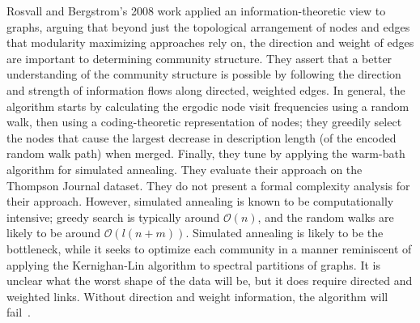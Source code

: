  \par{Rosvall and Bergstrom's 2008 work applied an information-theoretic view to graphs, arguing that beyond just the topological arrangement of nodes and edges that modularity maximizing approaches rely on, the direction and weight of edges are important to determining community structure. 
 They assert that a better understanding of the community structure is possible by following the direction and strength of information flows along directed, weighted edges. 
 In general, the algorithm starts by calculating the ergodic node visit frequencies using a random walk, then using a coding-theoretic representation of nodes; they greedily select the nodes that cause the largest decrease in description length (of the encoded random walk path) when merged. 
 Finally, they tune by applying the warm-bath algorithm for simulated annealing. 
 They evaluate their approach on the Thompson Journal dataset. 
 They do not present a formal complexity analysis for their approach. 
 However, simulated annealing is known to be computationally intensive; greedy search is typically around $\mathcal{O}(n)$, and the random walks are likely to be around $\mathcal{O}(l(n+m))$. 
 Simulated annealing is likely to be the bottleneck, while it seeks to optimize each community in a manner reminiscent of applying the Kernighan-Lin algorithm to spectral partitions of graphs. 
 It is unclear what the worst shape of the data will be, but it does require directed and weighted links. 
 Without direction and weight information, the algorithm will fail~\cite{Rosvall2008}.}

